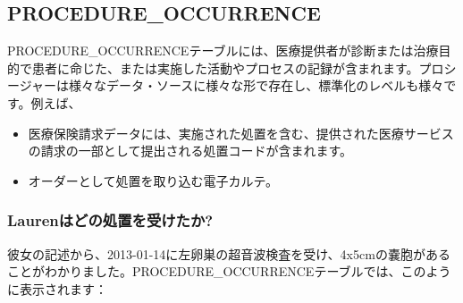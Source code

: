\documentclass[
  11pt]{book}
\providecommand{\tightlist}{%
  \setlength{\itemsep}{0pt}\setlength{\parskip}{0pt}}
\theoremstyle{definition}
\theoremstyle{definition}
\theoremstyle{definition}
\theoremstyle{definition}
\theoremstyle{remark}
\begin{document}
\subsection{PROCEDURE\_OCCURRENCE}\label{procedureOccurrence}

PROCEDURE\_OCCURRENCEテーブルには、医療提供者が診断または治療目的で患者に命じた、または実施した活動やプロセスの記録が含まれます。プロシージャーは様々なデータ・ソースに様々な形で存在し、標準化のレベルも様々です。例えば、

\begin{itemize}
\tightlist
\item
  医療保険請求データには、実施された処置を含む、提供された医療サービスの請求の一部として提出される処置コードが含まれます。
\item
  オーダーとして処置を取り込む電子カルテ。
\end{itemize}

\subsubsection*{Laurenはどの処置を受けたか?}\label{laurenux306fux3069ux306eux51e6ux7f6eux3092ux53d7ux3051ux305fux304b}

彼女の記述から、2013-01-14に左卵巣の超音波検査を受け、4x5cmの嚢胞があることがわかりました。PROCEDURE\_OCCURRENCEテーブルでは、このように表示されます：
\end{document}
